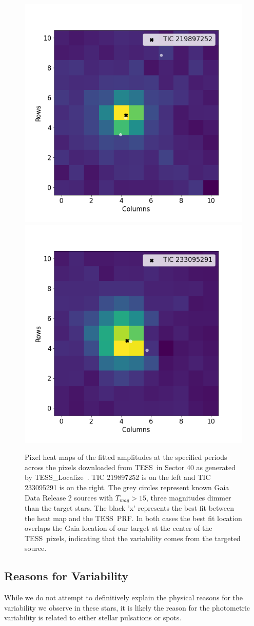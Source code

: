 \documentclass[twocolumn]{aastex631}
\newcommand{\tess}{TESS}
\newcommand{\tesslocalize}{{{\fontfamily{lmtt}\selectfont TESS\_Localize}}}
\begin{document}
\begin{figure}
\centering
\includegraphics[width=0.45\linewidth]{figures/TIC219897252_s040_5modes_tloc.png}
\includegraphics[width=0.45\linewidth]{figures/TIC233095291_s040_2modes_tloc.png}
\caption{Pixel heat maps of the fitted amplitudes at the specified periods across the pixels downloaded from \tess\ in Sector 40 as generated by \tesslocalize\ \citep[][]{HiggensBell}. TIC 219897252 is on the left and TIC 233095291 is on the right. The grey circles represent known Gaia Data Release 2 sources with $T_{mag} > 15$, three magnitudes dimmer than the target stars. The black 'x' represents the best fit between the heat map and the \tess\ PRF. In both cases the best fit location overlaps the Gaia location of our target at the center of the \tess\ pixels, indicating that the variability comes from the targeted source.} 
\label{fig:cent}
\end{figure}

\subsection{Reasons for Variability}

While we do not attempt to definitively explain the physical reasons for the variability we observe in these stars, it is likely the reason for the photometric variability is related to either stellar pulsations or spots. 
\end{document}
